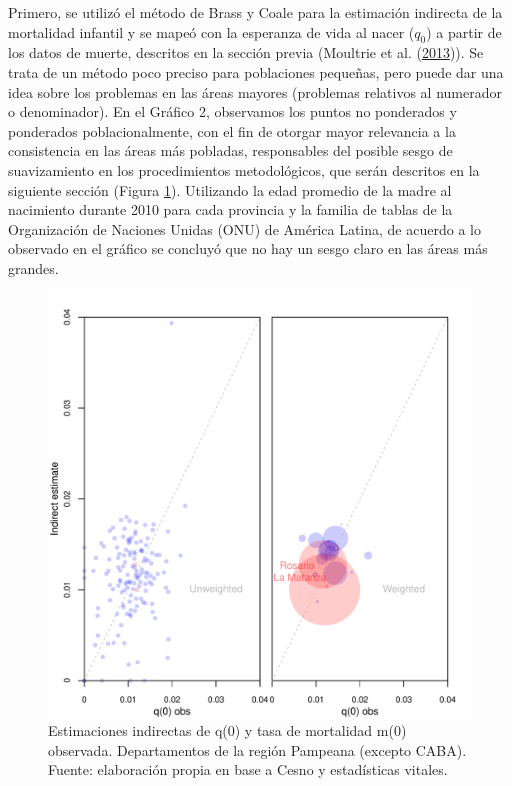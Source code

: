 \documentclass[12pt,]{article}
\begin{document}
Primero, se utilizó el método de Brass y Coale para la estimación
indirecta de la mortalidad infantil y se mapeó con la esperanza de vida
al nacer (\(q_0\)) a partir de los datos de muerte, descritos en la
sección previa (Moultrie et al.
(\protect\hyperlink{ref-Moultrie}{2013})). Se trata de un método poco
preciso para poblaciones pequeñas, pero puede dar una idea sobre los
problemas en las áreas mayores (problemas relativos al numerador o
denominador). En el Gráfico 2, observamos los puntos no ponderados y
ponderados poblacionalmente, con el fin de otorgar mayor relevancia a la
consistencia en las áreas más pobladas, responsables del posible sesgo
de suavizamiento en los procedimientos metodológicos, que serán
descritos en la siguiente sección (Figura \ref{fig:PF}). Utilizando la
edad promedio de la madre al nacimiento durante 2010 para cada provincia
y la familia de tablas de la Organización de Naciones Unidas (ONU) de
América Latina, de acuerdo a lo observado en el gráfico se concluyó que
no hay un sesgo claro en las áreas más grandes.

\begin{figure}

{\centering \includegraphics[width=0.7\linewidth]{analysis/plots/ChekPF} 

}

\caption{Estimaciones indirectas de q(0) y tasa de mortalidad m(0) observada. Departamentos de la región Pampeana (excepto CABA). Fuente: elaboración propia en base a Cesno y estadísticas vitales.}\label{fig:PF}
\end{figure}
\end{document}
